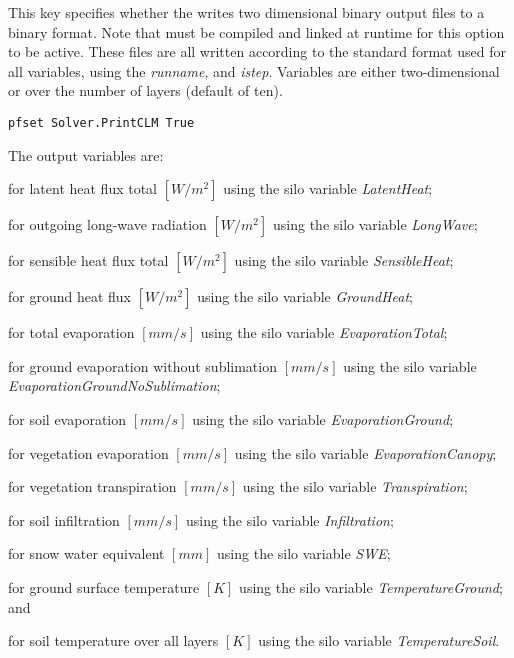 {This key specifies whether the  writes two dimensional binary output files to a  binary format. Note that  must be compiled and linked at runtime for this option to be active. These files are all written according to the standard format used for all \parflow{} variables, using the {\em runname}, and {\em istep}.  Variables are either two-dimensional or over the number of  layers (default of ten). 
}
\begin{display}\begin{verbatim}
pfset Solver.PrintCLM True
\end{verbatim}\end{display}
The output variables are:
\begin{description}
\item {} for latent heat flux total $[W/m^2]$ using the silo variable {\em LatentHeat};
\item {} for outgoing long-wave radiation $[W/m^2]$ using the silo variable {\em LongWave};
\item {} for sensible heat flux total $[W/m^2]$ using the silo variable {\em SensibleHeat};
\item {} for ground heat flux $[W/m^2]$ using the silo variable {\em GroundHeat};
\item {} for total evaporation $[mm/s]$ using the silo variable {\em EvaporationTotal}; 
\item {} for ground evaporation without sublimation $[mm/s]$ using the silo variable {\em EvaporationGroundNoSublimation};
\item {} for soil evaporation $[mm/s]$ using the silo variable {\em EvaporationGround};
\item {} for vegetation evaporation $[mm/s]$ using the silo variable {\em EvaporationCanopy};
\item {} for vegetation transpiration $[mm/s]$ using the silo variable {\em Transpiration}; 
\item {} for soil infiltration $[mm/s]$ using the silo variable {\em Infiltration};
\item {} for snow water equivalent $[mm]$ using the silo variable {\em SWE};
\item {} for ground surface temperature $[K]$ using the silo variable {\em TemperatureGround}; and 
\item {} for soil temperature over all layers $[K]$ using the silo variable {\em TemperatureSoil}.
\end{description}


